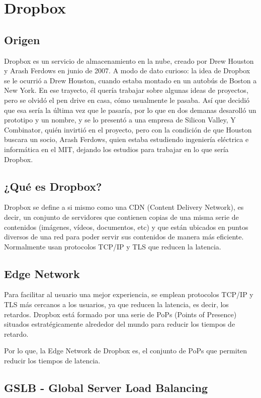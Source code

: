 \section{Dropbox}

\subsection{Origen}
Dropbox es un servicio de almacenamiento en la nube, creado por Drew Houston y Arash Ferdows en junio de 2007. A modo de dato curioso: la idea de Dropbox se le ocurrió a Drew Houston, cuando estaba montado en un autobús de Boston a New York. En ese trayecto, él quería trabajar sobre algunas ideas de proyectos, pero se olvidó el pen drive en casa, cómo usualmente le pasaba. Así que decidió que esa sería la última vez que le pasaría, por lo que en dos demanas desarolló un prototipo y un nombre, y se lo presentó a una empresa de Silicon Valley, Y Combinator, quién invirtió en el proyecto, pero con la condición de que Houston buscara un socio, Arash Ferdows, quien estaba estudiendo ingeniería eléctrica e informática en el MIT, dejando los estudios para trabajar en lo que sería Dropbox.

\subsection{¿Qué es Dropbox?}
Dropbox se define a si mismo como una CDN (Content Delivery Network), es decir, un conjunto de servidores que contienen copias de una misma serie de contenidos (imágenes, vídeos, documentos, etc) y que están ubicados en puntos diversos de una red para poder servir sus contenidos de manera más eficiente. Normalmente usan protocolos TCP/IP y TLS que reducen la latencia.
\subsection{Edge Network}
Para facilitar al usuario una mejor experiencia, se emplean protocolos TCP/IP y TLS más cercanos a los usuarios, ya que reducen la latencia, es decir, los retardos. Dropbox está formado por una serie de PoPs (Points of Presence) situados estratégicamente alrededor del mundo para reducir los tiempos de retardo.

Por lo que, la Edge Network de Dropbox es, el conjunto de PoPs que permiten reducir los tiempos de latencia.

\subsection{GSLB - Global Server Load Balancing}

